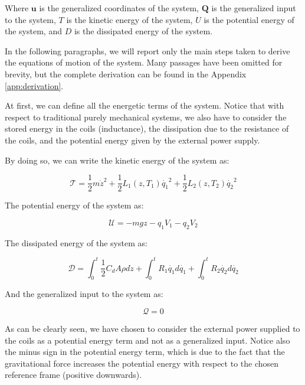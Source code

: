 Where $\mathbf{u}$ is the generalized coordinates of the system, $\mathbf{Q}$ is the generalized input to the system, $T$ is the kinetic energy of the system, $U$ is the potential energy of the system, and $D$ is the dissipated energy of the system.

In the following paragraphs, we will report only the main steps taken to derive the equations of motion of the system.
Many passages have been omitted for brevity, but the complete derivation can be found in the Appendix \ref{app:derivation}.

At first, we can define all the energetic terms of the system.
Notice that with respect to traditional purely mechanical systems, we also have to consider the stored energy in the coils (inductance), the dissipation due to the resistance of the coils, and the potential energy given by the external power supply.

By doing so, we can write the kinetic energy of the system as:

\begin{equation}
    \mathcal{T} = \frac{1}{2} m \dot{z}^2 + \frac{1}{2} L_1(z, T_1) \dot{q_1}^2 + \frac{1}{2} L_2(z, T_2) \dot{q_2}^2
    \label{eq:kinetic_energy}
\end{equation}

The potential energy of the system as:

\begin{equation}
    \mathcal{U} = -m g z - q_1 V_1 - q_2 V_2
    \label{eq:potential_energy}
\end{equation}

The dissipated energy of the system as:

\begin{equation}
    \mathcal{D} = \int_{0}^{t} \frac{1}{2} C_d A \rho d\dot{z} + \int_{0}^{t} R_1 \dot{q_1} d\dot{q_1} + \int_{0}^{t} R_2 \dot{q_2} d\dot{q_2}
    \label{eq:dissipated_energy}
\end{equation}

And the generalized input to the system as:

\begin{equation}
    \mathcal{Q} = 0
    \label{eq:generalized_input}
\end{equation}

As can be clearly seen, we have chosen to consider the external power supplied to the coils as a potential energy term and not as a generalized input.
Notice also the minus sign in the potential energy term, which is due to the fact that the gravitational force increases the potential energy with respect to the chosen reference frame (positive downwards).


